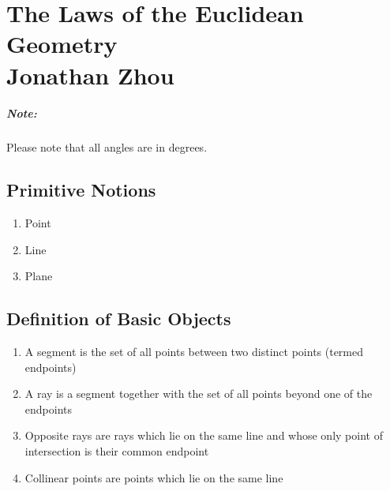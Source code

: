 \documentclass[11pt,letterpaper]{report}
\begin{document}
\theoremstyle{plain}
\newtheorem{thm}{Theorem}[section]
\theoremstyle{definition}
\newtheorem{defn}[thm]{Definiton}

\chapter*{The Laws of the Euclidean Geometry\\\vspace{.5em} \Large{Jonathan Zhou}}
\paragraph{Note:}
Please note that all angles are in degrees. 

\section*{Primitive Notions}
\begin{enumerate}
    \item Point
    \item Line
    \item Plane
\end{enumerate}

\section*{Definition of Basic Objects}
\begin{enumerate}
     \item A segment is the set of all points between two distinct points (termed endpoints)
     \item A ray is a segment together with the set of all points beyond one of the endpoints
     \item Opposite rays are rays which lie on the same line and whose only point of intersection is their common endpoint
     \item Collinear points are points which lie on the same line\end{enumerate}
\end{document}
